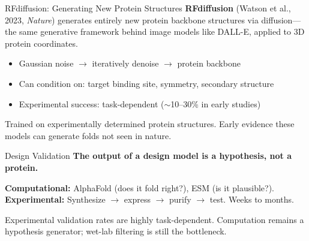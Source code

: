 \documentclass[aspectratio=169,10pt]{beamer}
\begin{document}
\begin{frame}{RFdiffusion: Generating New Protein Structures}
\textbf{RFdiffusion} (Watson et al., 2023, \textit{Nature}) generates entirely new protein backbone structures via diffusion---the same generative framework behind image models like DALL-E, applied to 3D protein coordinates.
\begin{center}
\end{center}
\begin{itemize}
    \item Gaussian noise $\to$ iteratively denoise $\to$ protein backbone
    \item Can condition on: target binding site, symmetry, secondary structure
    \item Experimental success: task-dependent ($\sim$10--30\% in early studies)
\end{itemize}
{\small Trained on experimentally determined protein structures. Early evidence these models can generate folds not seen in nature.}
\end{frame}

\begin{frame}{Design Validation}
\textbf{The output of a design model is a hypothesis, not a protein.}
\vspace{0.2em}

\textbf{Computational:} AlphaFold (does it fold right?), ESM (is it plausible?).\\
\textbf{Experimental:} Synthesize $\to$ express $\to$ purify $\to$ test. Weeks to months.
\vspace{0.3em}

Experimental validation rates are highly task-dependent. Computation remains a hypothesis generator; wet-lab filtering is still the bottleneck.
\end{frame}
\end{document}
